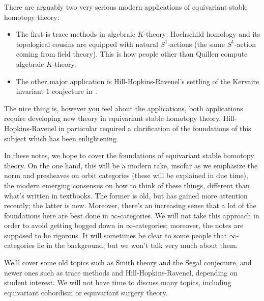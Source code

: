 There are arguably two very serious modern applications of equivariant stable homotopy theory: 

\begin{itemize}
	\item The first is trace methods in algebraic $K$-theory:
	Hochschild homology and its topological cousins are equipped with natural
	$S^1$-actions (the same $S^1$-action coming from field theory). This is how people other than Quillen compute
	algebraic $K$-theory.
	\item The other major application is Hill-Hopkins-Ravenel's settling of the Kervaire invariant $1$ conjecture
	in~\cite{HHR}.
\end{itemize}
The nice thing is, however you feel about the applications, both applications require developing new theory in
equivariant stable homotopy theory. Hill-Hopkins-Ravenel in particular required a clarification of the foundations
of this subject which has been enlightening.

In these notes, we hope to cover the foundations of equivariant stable homotopy theory. On the one hand, this will
be a modern take, insofar as we emphasize the norm and presheaves on orbit categories (these will be explained in
due time), the modern emerging consensus on how to think of these things, different than what's written in
textbooks. The former is old, but has gained more attention recently; the latter is new. Moreover, there's an
increasing sense that a lot of the foundations here are best done in $\infty$-categories.
We will not take this approach in order to avoid getting bogged down in $\infty$-categories; moreover, the notes
are supposed to be rigorous. It will sometimes be clear to some people that $\infty$-categories lie in the
background, but we won't talk very much about them.

We'll cover some old topics such as Smith theory and the Segal conjecture, and newer ones such as trace methods
and Hill-Hopkins-Ravenel, depending on student interest. We will not have time to discuss many topics, including
equivariant cobordism or equivariant surgery theory.
